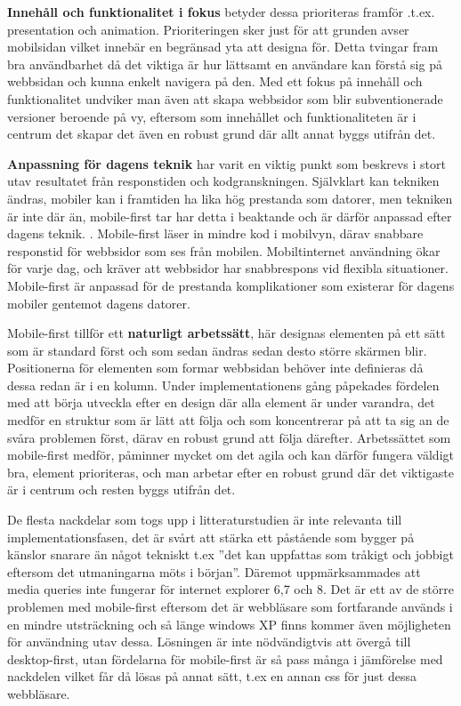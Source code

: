\documentclass[11pt]{article}
\begin{document}
\textbf{Innehåll och funktionalitet i fokus} betyder dessa prioriteras framför .t.ex. presentation och animation. Prioriteringen sker just för att grunden avser mobilsidan vilket innebär en begränsad yta att designa för. Detta tvingar fram bra användbarhet då det viktiga är hur lättsamt en användare kan förstå sig på webbsidan och kunna enkelt navigera på den. Med ett fokus på innehåll och funktionalitet undviker man även att skapa webbsidor som blir subventionerade versioner beroende på vy, eftersom som innehållet och funktionaliteten är i centrum det skapar det även en robust grund där allt annat byggs utifrån det.

\textbf{Anpassning för dagens teknik} har varit en viktig punkt som beskrevs i stort utav resultatet från responstiden och kodgranskningen. Självklart kan tekniken ändras, mobiler kan i framtiden ha lika hög prestanda som datorer, men tekniken är inte där än, mobile-first tar har detta i beaktande och är därför anpassad efter dagens teknik. . Mobile-first läser in mindre kod i mobilvyn, därav snabbare responstid för webbsidor som ses från mobilen. Mobiltinternet användning ökar för varje dag, och kräver att webbsidor har snabbrespons vid flexibla situationer. Mobile-first är anpassad för de prestanda komplikationer som existerar för dagens mobiler gentemot dagens datorer.

Mobile-first tillför ett \textbf{naturligt arbetssätt}, här designas elementen på ett sätt som är standard först och som sedan ändras sedan desto större skärmen blir. Positionerna för elementen som formar webbsidan behöver inte definieras då dessa redan är i en kolumn. Under implementationens gång påpekades fördelen med att börja utveckla efter en design där alla element är under varandra, det medför en struktur som är lätt att följa och som koncentrerar på att ta sig an de svåra problemen först, därav en robust grund att följa därefter. Arbetssättet som mobile-first medför, påminner mycket om det agila och kan därför fungera väldigt bra, element prioriteras, och man arbetar efter en robust grund där det viktigaste är i centrum och resten byggs utifrån det.

De flesta nackdelar som togs upp i litteraturstudien är inte relevanta till implementationsfasen, det är svårt att stärka ett påstående som bygger på känslor snarare än något tekniskt t.ex ”det kan uppfattas som tråkigt och jobbigt eftersom det utmaningarna möts i början”. Däremot uppmärksammades att media queries inte fungerar för internet explorer 6,7 och 8. Det är ett av de större problemen med mobile-first eftersom det är webbläsare som fortfarande används i en mindre utsträckning och så länge windows XP finns kommer även möjligheten för användning utav dessa. Lösningen är inte nödvändigtvis att övergå till desktop-first, utan fördelarna för mobile-first är så pass många i jämförelse med nackdelen vilket får då lösas på annat sätt, t.ex en annan css för just dessa webbläsare.
\end{document}
